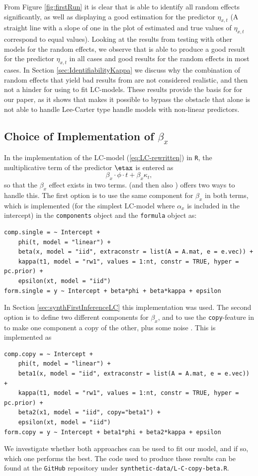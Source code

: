 From Figure \ref{fig:firstRun} it is clear that \inlabru is able to identify all random effects significantly, as well as displaying a good estimation for the predictor $\eta_{x,t}$ (A straight line with a slope of one in the plot of estimated and true values of $\eta_{x,t}$ correspond to equal values). Looking at the results from testing \inlabru with other models for the random effects, we observe that \inlabru is able to produce a good result for the predictor $\eta_{x,t}$ in all cases and good results for the random effects in most cases. In Section \ref{sec:IdentifiabilityKappa} we discuss why the combination of random effects that yield bad results from \inlabru are not considered realistic, and then not a hinder for using \inlabru to fit LC-models. These results provide the basis for for our paper, as it shows that \inlabru makes it possible to bypass the obstacle that \inla alone is not able to handle Lee-Carter type handle models with non-linear predictors.

\subsection{Choice of Implementation of $\beta_x$}
In the implementation of the LC-model (\ref{eq:LC-rewritten}) in \texttt{R}, the multiplicative term of the predictor $\etax$ is entered as
\begin{equation}
    \beta_x\cdot\phi \cdot t + \beta_x\kappa_t,
\end{equation}
so that the $\beta_x$ effect exists in two terms. \inla (and then also \inlabru) offers two ways to handle this. The first option is to use the same component for $\beta_x$ in both terms, which is implemented (for the simplest LC-model where $\alpha_x$ is included in the intercept) in the \texttt{components} object and the \texttt{formula} object as:
\begin{verbatim}
comp.single = ~ Intercept + 
    phi(t, model = "linear") + 
    beta(x, model = "iid", extraconstr = list(A = A.mat, e = e.vec)) + 
    kappa(t1, model = "rw1", values = 1:nt, constr = TRUE, hyper = pc.prior) + 
    epsilon(xt, model = "iid")
form.single = y ~ Intercept + beta*phi + beta*kappa + epsilon
\end{verbatim}
In Section \ref{sec:synthFirstInferenceLC} this implementation was used. The second option is to define two different components for $\beta_x$, and to use the \texttt{copy}-feature in \inla to make one component a copy of the other, plus some noise \cite{MARTINS201368}. This is implemented as
\begin{verbatim}
comp.copy = ~ Intercept + 
    phi(t, model = "linear") + 
    beta1(x, model = "iid", extraconstr = list(A = A.mat, e = e.vec)) + 
    kappa(t1, model = "rw1", values = 1:nt, constr = TRUE, hyper = pc.prior) + 
    beta2(x1, model = "iid", copy="beta1") +
    epsilon(xt, model = "iid")
form.copy = y ~ Intercept + beta1*phi + beta2*kappa + epsilon
\end{verbatim}
We investigate whether both approaches can be used to fit our model, and if so, which one performs the best. The code used to produce these results can be found at the \texttt{GitHub} repository under \texttt{synthetic-data/L-C-copy-beta.R}. 

